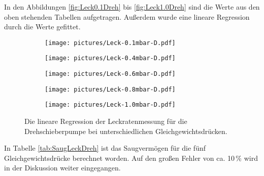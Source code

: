 In den Abbildungen \eqref{fig:Leck0.1Dreh} bis \eqref{fig:Leck1.0Dreh} sind die Werte aus den oben stehenden Tabellen aufgetragen. Außerdem wurde eine lineare Regression durch die Werte gefittet.

\begin{figure}[H]
  \begin{subfigure}[c]{0.49\textwidth}
    \texttt{[image: pictures/Leck-0.1mbar-D.pdf]}
    \label{fig:Leck0.1Dreh}
  \end{subfigure}\hfill
  \begin{subfigure}[c]{0.49\textwidth}
    \texttt{[image: pictures/Leck-0.4mbar-D.pdf]}
    \label{fig:Leck0.4Dreh}
  \end{subfigure}

  \begin{subfigure}[c]{0.49\textwidth}
    \texttt{[image: pictures/Leck-0.6mbar-D.pdf]}
    \label{fig:Leck0.6Dreh}
  \end{subfigure}\hfill
  \begin{subfigure}[c]{0.49\textwidth}
    \texttt{[image: pictures/Leck-0.8mbar-D.pdf]}
    \label{fig:Leck0.8Dreh}
  \end{subfigure}

  \begin{subfigure}[c]{0.49\textwidth}
    \texttt{[image: pictures/Leck-1.0mbar-D.pdf]}
    \label{fig:Leck1.0Dreh}
  \end{subfigure}
  \caption{Die lineare Regression der Leckratenmessung für die Drehschieberpumpe bei unterschiedlichen Gleichgewichtsdrücken.}
\end{figure}

In Tabelle \eqref{tab:SaugLeckDreh} ist das Saugvermögen für die fünf Gleichgewichtsdrücke berechnet worden. Auf den großen Fehler von ca. 10\,\% wird in der Diskussion weiter eingegangen.

